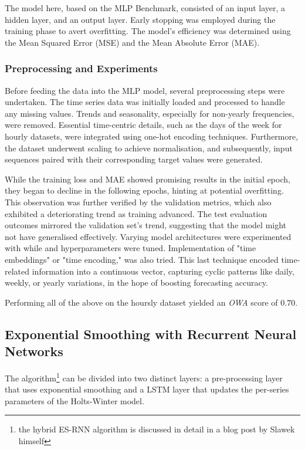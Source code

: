 \documentclass[conference]{IEEEtran}
\begin{document}
The model here, based on the MLP Benchmark\cite{mlp}, consisted of an input layer, a hidden layer, and an output layer. Early stopping was employed during the training phase to avert overfitting. The model's efficiency was determined using the Mean Squared Error (MSE) and the Mean Absolute Error (MAE).

\subsubsection{Preprocessing and Experiments}

Before feeding the data into the MLP model, several preprocessing steps were undertaken. The time series data was initially loaded and processed to handle any missing values. Trends and seasonality, especially for non-yearly frequencies, were removed. Essential time-centric details, such as the days of the week for hourly datasets, were integrated using one-hot encoding techniques. Furthermore, the dataset underwent scaling to achieve normalisation, and subsequently, input sequences paired with their corresponding target values were generated.

While the training loss and MAE showed promising results in the initial epoch, they began to decline in the following epochs, hinting at potential overfitting. This observation was further verified by the validation metrics, which also exhibited a deteriorating trend as training advanced. The test evaluation outcomes mirrored the validation set's trend, suggesting that the model might not have generalised effectively. Varying model architectures were experimented with while and hyperparameters were tuned. Implementation of "time embeddings" or "time encoding," was also tried. This last technique encoded time-related information into a continuous vector, capturing cyclic patterns like daily, weekly, or yearly variations, in the hope of boosting forecasting accuracy.

Performing all of the above on the hoursly dataset yielded an \textit{OWA} score of $0.70$.

\subsection{Exponential Smoothing with Recurrent Neural Networks}

The algorithm\footnote{the hybrid ES-RNN algorithm is discussed in detail in a blog post by Slawek himself\cite{slawek}} can be divided into two distinct layers: a pre-processing layer that uses exponential smoothing and a LSTM layer that updates the per-series parameters of the Holts-Winter model.
\end{document}
